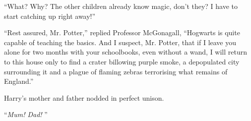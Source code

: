 ``What? Why? The other children already know magic, don't they? I have
to start catching up right away!''

``Rest assured, Mr. Potter,'' replied Professor McGonagall, ``Hogwarts
is quite capable of teaching the basics. And I suspect, Mr. Potter, that
if I leave you alone for two months with your schoolbooks, even without
a wand, I will return to this house only to find a crater billowing
purple smoke, a depopulated city surrounding it and a plague of flaming
zebras terrorising what remains of England.''

Harry's mother and father nodded in perfect unison.

``\emph{Mum! Dad!} ''
